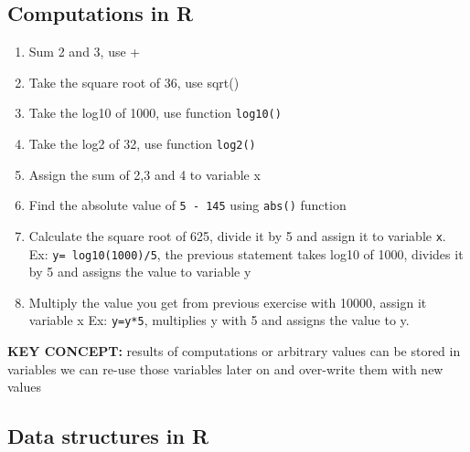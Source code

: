 \documentclass[12pt,]{krantz}
\begin{document}
\hypertarget{computations-in-r-1}{%
\subsection{Computations in R}\label{computations-in-r-1}}

\begin{enumerate}
\def\labelenumi{\arabic{enumi}.}
\item
  Sum 2 and 3, use +
\item
  Take the square root of 36, use sqrt()
\item
  Take the log10 of 1000, use function \texttt{log10()}
\item
  Take the log2 of 32, use function \texttt{log2()}
\item
  Assign the sum of 2,3 and 4 to variable x
\item
  Find the absolute value of \texttt{5\ -\ 145} using \texttt{abs()} function
\item
  Calculate the square root of 625, divide it by 5 and assign it to variable \texttt{x}.
  Ex: \texttt{y=\ log10(1000)/5}, the previous statement takes log10 of 1000, divides it
  by 5 and assigns the value to variable y
\item
  Multiply the value you get from previous exercise with 10000, assign it variable x
  Ex: \texttt{y=y*5}, multiplies y with 5 and assigns the value to y.
\end{enumerate}

\textbf{KEY CONCEPT:} results of computations or arbitrary values can be stored in variables we can re-use those variables later on and over-write them with new values

\hypertarget{data-structures-in-r}{%
\subsection{Data structures in R}\label{data-structures-in-r}}
\end{document}
